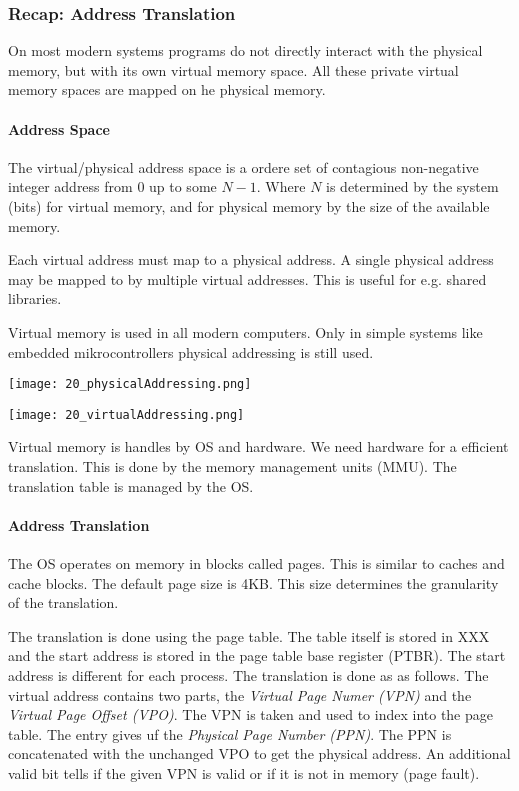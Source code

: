 


\subsubsection{Recap: Address Translation}
On most modern systems programs do not directly interact with the physical memory, but with its own virtual memory space. All these private virtual memory spaces are mapped on he physical memory.

\paragraph{Address Space}
The virtual/physical address space is a ordere set of contagious non-negative integer address from $0$ up to some $N - 1$. Where $N$ is determined by the system (bits) for virtual memory, and for physical memory by the size of the available memory.

Each virtual address must map to a physical address. A single physical address may be mapped to by multiple virtual addresses. This is useful for e.g. shared libraries.

Virtual memory is used in all modern computers. Only in simple systems like embedded mikrocontrollers physical addressing is still used.

\texttt{[image: 20\_physicalAddressing.png]}

\texttt{[image: 20\_virtualAddressing.png]}

Virtual memory is handles by OS and hardware. We need hardware for a efficient translation. This is done by the memory management units (MMU). The translation table is managed by the OS.

\paragraph{Address Translation}
The OS operates on memory in blocks called pages. This is similar to caches and cache blocks. The default page size is 4KB. This size determines the granularity of the translation.

The translation is done using the page table. The table itself is stored in XXX and the start address is stored in the page table base register (PTBR). The start address is different for each process. The translation is done as as follows. The virtual address contains two parts, the \textit{Virtual Page Numer (VPN)} and the \textit{Virtual Page Offset (VPO)}. The VPN is taken and used to index into the page table. The entry gives uf the \textit{Physical Page Number (PPN)}. The PPN is concatenated with the unchanged VPO to get the physical address. An additional valid bit tells if the given VPN is valid or if it is not in memory (page fault).

